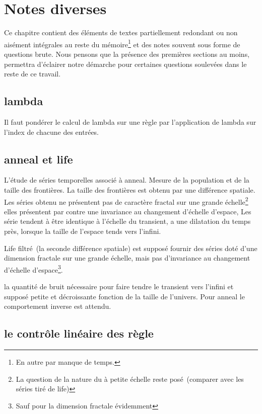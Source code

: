 \chapter{Notes diverses}

Ce chapitre contient des \'el\'ements de textes partiellement redondant ou
non ais\'ement int\'egrales au reste du m\'emoire\footnote{%
  En autre par manque de temps.} %
et des notes souvent sous forme de questions brute. %
Nous pensons que la pr\'esence des premi\`eres sections au moins,
permettra d'\'eclairer notre d\'emarche pour certaines questions soulev\'ees
dans le reste de ce travail.

\section{lambda}

Il faut pond\'erer le calcul de lambda sur une r\`egle par l'application
de lambda sur l'index de chacune des entr\'ees. %

\section{anneal et life}

L'\'etude de s\'eries temporelles associ\'e \`a anneal. %
Mesure de la population et de la taille des fronti\`eres. %
La taille des fronti\`eres est obtenu par une diff\'erence spatiale. %
Les s\'eries obtenu ne pr\'esentent pas de caract\`ere fractal sur une
grande \'echelle\footnote{%
  La question de la nature du  \`a
  petite \'echelle reste pos\'e~(comparer avec les s\'eries tir\'e de life)} %
elles pr\'esentent par contre une invariance au changement d'\'echelle
d'espace, \ie Les s\'erie tendent \`a \^etre identique \`a l'\'echelle du
transient, a une dilatation du temps pr\`es, lorsque la taille de
l'espace tends vers l'infini.

Life filtr\'e~(la seconde diff\'erence spatiale) est suppos\'e fournir des
s\'eries dot\'e d'une dimension fractale sur une grande \'echelle, mais pas
d'invariance au changement d'\'echelle d'espace\footnote{%
  Sauf pour la dimension fractale \'evidemment}.

la quantit\'e de bruit n\'ecessaire pour faire tendre le transient vers
l'infini et suppos\'e petite et d\'ecroissante fonction de la taille de
l'univers. %
Pour anneal le comportement inverse est attendu.

\section{le contr\^ole lin\'eaire des r\`egle}

